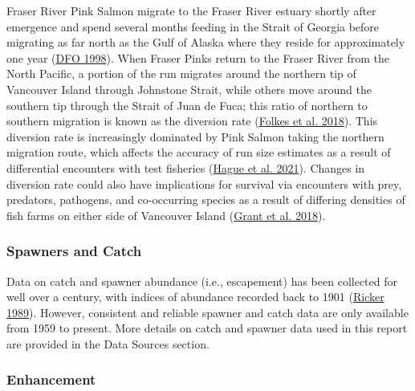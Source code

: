 \documentclass[11pt]{book}
\begin{document}
Fraser River Pink Salmon migrate to the Fraser River estuary shortly after emergence and spend several months feeding in the Strait of Georgia before migrating as far north as the Gulf of Alaska where they reside for approximately one year (\protect\hyperlink{ref-dfoFraserRiverSalmon1998}{DFO 1998}). When Fraser Pinks return to the Fraser River from the North Pacific, a portion of the run migrates around the northern tip of Vancouver Island through Johnstone Strait, while others move around the southern tip through the Strait of Juan de Fuca; this ratio of northern to southern migration is known as the diversion rate (\protect\hyperlink{ref-folkesEvaluatingModelsForecast2018}{Folkes et al. 2018}). This diversion rate is increasingly dominated by Pink Salmon taking the northern migration route, which affects the accuracy of run size estimates as a result of differential encounters with test fisheries (\protect\hyperlink{ref-hagueMovingTargetsAssessing2021}{Hague et al. 2021}). Changes in diversion rate could also have implications for survival via encounters with prey, predators, pathogens, and co-occurring species as a result of differing densities of fish farms on either side of Vancouver Island (\protect\hyperlink{ref-grantSummaryFraserRiver2018}{Grant et al. 2018}).

\hypertarget{spawners-and-catch}{%
\subsubsection{Spawners and Catch}\label{spawners-and-catch}}

Data on catch and spawner abundance (i.e., escapement) has been collected for well over a century, with indices of abundance recorded back to 1901 (\protect\hyperlink{ref-rickerHistoryPresentState1989}{Ricker 1989}). However, consistent and reliable spawner and catch data are only available from 1959 to present. More details on catch and spawner data used in this report are provided in the Data Sources section.

\hypertarget{enhancement}{%
\subsubsection{Enhancement}\label{enhancement}}
\end{document}
